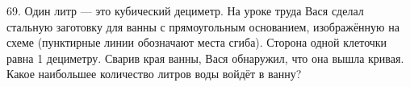 69. Один литр --- это кубический дециметр. На уроке труда Вася сделал стальную заготовку для ванны с прямоугольным основанием, изображённую на схеме (пунктирные линии обозначают места сгиба). Сторона одной клеточки равна 1 дециметру. Сварив края ванны, Вася обнаружил, что она вышла кривая. Какое наибольшее количество литров воды войдёт в ванну?
\begin{center}
\begin{figure}[ht!]
\end{figure}
\end{center}
